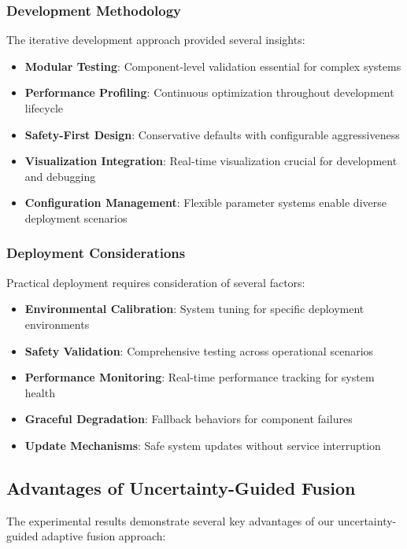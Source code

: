 \documentclass[12pt,oneside]{book}
\begin{document}
\subsubsection{Development Methodology}

The iterative development approach provided several insights:

\begin{itemize}
\item \textbf{Modular Testing}: Component-level validation essential for complex systems
\item \textbf{Performance Profiling}: Continuous optimization throughout development lifecycle
\item \textbf{Safety-First Design}: Conservative defaults with configurable aggressiveness
\item \textbf{Visualization Integration}: Real-time visualization crucial for development and debugging
\item \textbf{Configuration Management}: Flexible parameter systems enable diverse deployment scenarios
\end{itemize}

\subsubsection{Deployment Considerations}

Practical deployment requires consideration of several factors:

\begin{itemize}
\item \textbf{Environmental Calibration}: System tuning for specific deployment environments
\item \textbf{Safety Validation}: Comprehensive testing across operational scenarios
\item \textbf{Performance Monitoring}: Real-time performance tracking for system health
\item \textbf{Graceful Degradation}: Fallback behaviors for component failures
\item \textbf{Update Mechanisms}: Safe system updates without service interruption
\end{itemize}

\subsection{Advantages of Uncertainty-Guided Fusion}

The experimental results demonstrate several key advantages of our uncertainty-guided adaptive fusion approach:
\end{document}
